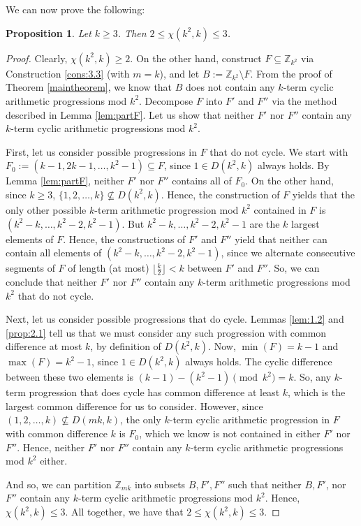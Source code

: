 \documentclass{article}
\newtheorem{proposition}[theorem]{Proposition}
\theoremstyle{definition}
\theoremstyle{remark}
\begin{document}
We can now prove the following:

\begin{proposition}\label{prop:4.2new}
    Let $k \geq 3$. Then $2 \leq \chi(k^2,k) \leq 3$.
\end{proposition}

\begin{proof}
    Clearly, $\chi(k^2,k) \geq 2$. On the other hand, construct $F \subseteq \mathbb{Z}_{k^2}$ via Construction \ref{cons:3.3} (with $m=k$), and let $B := \mathbb{Z}_{k^2} \setminus F$. From the proof of Theorem \ref{maintheorem}, we know that $B$ does not contain any $k$-term cyclic arithmetic progressions mod $k^2$. Decompose $F$ into $F'$ and $F''$ via the method described in Lemma \ref{lem:partF}. Let us show that neither $F'$ nor $F''$ contain any $k$-term cyclic arithmetic progressions mod $k^2$. 

    First, let us consider possible progressions in $F$ that do not cycle. We start with $F_0 := (k-1,2k-1,\ldots,k^2-1) \subseteq F$, since $1 \in D(k^2,k)$ always holds. By Lemma \ref{lem:partF}, neither $F'$ nor $F''$ contains all of $F_0$. On the other hand, since $k \geq 3$, $\{1,2,\ldots,k\} \not\subseteq D(k^2,k)$. Hence, the construction of $F$ yields that the only other possible $k$-term arithmetic progression mod $k^2$ contained in $F$ is $(k^2-k,\ldots,k^2-2,k^2-1)$. But $k^2-k,\ldots,k^2-2,k^2-1$ are the $k$ largest elements of $F$. Hence, the constructions of $F'$ and $F''$ yield that neither can contain all elements of $(k^2-k,\ldots,k^2-2,k^2-1)$, since we alternate consecutive segments of $F$ of length (at most) $\lfloor\frac{k}{2}\rfloor < k$ between $F'$ and $F''$. So, we can conclude that neither $F'$ nor $F''$ contain any $k$-term arithmetic progressions mod $k^2$ that do not cycle.

    Next, let us consider possible progressions that do cycle. Lemmas \ref{lem:1.2} and \ref{prop:2.1} tell us that we must consider any such progression with common difference at most $k$, by definition of $D(k^2,k)$. Now, $\min(F) = k-1$ and $\max(F) = k^2-1$, since $1 \in D(k^2,k)$ always holds. The cyclic difference between these two elements is $(k-1)-(k^2-1) \pmod {k^2} = k$. So, any $k$-term progression that does cycle has common difference at least $k$, which is the largest common difference for us to consider. However, since $(1,2,\ldots,k) \not\subseteq D(mk,k)$, the only $k$-term cyclic arithmetic progression in $F$ with common difference $k$ is $F_0$, which we know is not contained in either $F'$ nor $F''$. Hence, neither $F'$ nor $F''$ contain any $k$-term cyclic arithmetic progressions mod $k^2$ either.

    And so, we can partition $\mathbb{Z}_{mk}$ into subsets $B,F',F''$ such that neither $B,F'$, nor $F''$ contain any $k$-term cyclic arithmetic progressions mod $k^2$. Hence, $\chi(k^2,k) \leq 3$. All together, we have that $2 \leq \chi(k^2,k) \leq 3$.
\end{proof}
\end{document}
